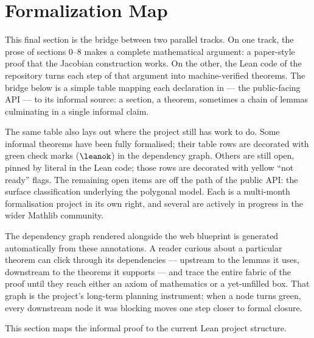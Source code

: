 \section{Formalization Map}
\label{sec:formalization-map}

\begin{layman}
This final section is the bridge between two parallel tracks. On
one track, the prose of sections 0--8 makes a complete
mathematical argument: a paper-style proof that the Jacobian
construction works. On the other, the Lean code of the
 repository turns each step of that argument into
machine-verified theorems. The bridge below is a simple table
mapping each declaration in  --- the
public-facing API --- to its informal source: a section, a theorem,
sometimes a chain of lemmas culminating in a single informal
claim.

The same table also lays out where the project still has work to
do. Some informal theorems have been fully formalised; their
table rows are decorated with green check marks (\(\leanok\)) in
the dependency graph. Others are still open, pinned by literal
 in the Lean code; those rows are decorated with
yellow ``not ready'' flags. The remaining open items are
off the path of the public API: the surface classification underlying
the polygonal model. Each is a multi-month formalisation project in its own
right, and several are actively in progress in the wider Mathlib
community.

The dependency graph rendered alongside the web blueprint is
generated automatically from these annotations. A reader curious
about a particular theorem can click through its dependencies ---
upstream to the lemmas it uses, downstream to the theorems it
supports --- and trace the entire fabric of the proof until they
reach either an axiom of mathematics or a yet-unfilled box. That
graph is the project's long-term planning instrument: when a
node turns green, every downstream node it was blocking moves one
step closer to formal closure.
\end{layman}

This section maps the informal proof to the current Lean project structure.

